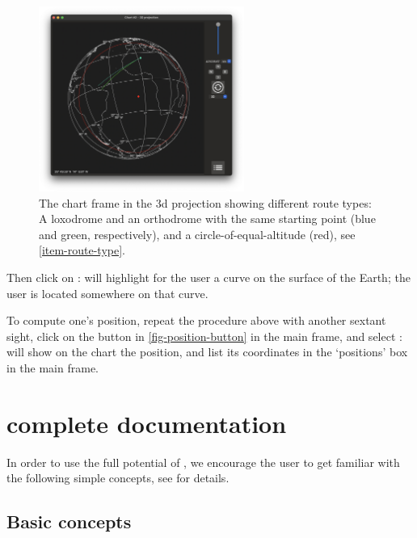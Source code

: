 \documentclass{ol-softwaremanual}
\begin{document}
  \begin{figure}
    \includegraphics[width=0.6\textwidth]{figures/route-types.png}
    \centering
    \caption{
      \label{fig-route-types}
      The chart frame in the 3d projection showing different \gls{route} types: A \gls{loxodrome} and an \gls{orthodrome} with the same starting point (blue and green, respectively), and a \gls{circle-of-equal-altitude} (red), see \cref{item-route-type}. 
    }
    \end{figure}

  Then click on : \thel will highlight for the user a curve on the surface of the Earth; the user is located somewhere on that curve. 

To compute one's \gls{position}, repeat the procedure above with another \gls{sextant} \gls{sight}, click on the button in \cref{fig-position-button} in the main frame, and select : \thel will show on the chart the \gls{position}, and list its coordinates in the `\Glspl{position}' box in the main frame. 




\acresetall


\section{\thel complete documentation}



In order to use the full potential of \thel, we encourage the user to get familiar with the following simple concepts, see \cite{bowditch2002the} for details. 

\subsection{Basic concepts}
\end{document}
